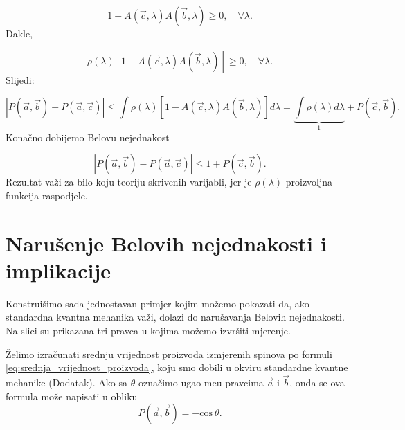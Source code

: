 \begin{equation}
    1 - A(\vec{c}, \lambda) A(\vec{b}, \lambda) \ge 0 , \quad \forall \lambda.
\end{equation}
Dakle,

\begin{equation}
    \rho (\lambda)[1 - A(\vec{c}, \lambda) A(\vec{b}, \lambda) ] \ge 0, \quad \forall \lambda.
\end{equation}
Slijedi:


\begin{equation}
    \left|{P(\vec{a}, \vec{b}) - P(\vec{a}, \vec{c})}\right| \le  \int  \rho (\lambda)  [1- A(\vec{c}, \lambda) A(\vec{b}, \lambda)  ]  d\lambda = \underbrace{\int \rho(\lambda)d\lambda}_{1} + P(\vec{c}, \vec{b}).
\end{equation}
Konačno dobijemo Belovu nejednakost

\begin{equation}
    \left|{P(\vec{a}, \vec{b}) - P(\vec{a}, \vec{c})}\right| \le 1 +  P(\vec{c}, \vec{b}).
\end{equation}
Rezultat važi za bilo koju teoriju skrivenih varijabli, jer je $\rho(\lambda)$ proizvoljna funkcija raspodjele.

\section{Narušenje Belovih nejednakosti i implikacije}

Konstruišimo sada jednostavan primjer kojim možemo pokazati da, ako standardna kvantna mehanika važi,  dolazi do narušavanja Belovih nejednakosti. Na slici
su prikazana tri pravca u kojima možemo izvršiti mjerenje.

Želimo izračunati srednju vrijednost proizvoda izmjerenih spinova po formuli \eqref{eq:srednja_vrijednost_proizvoda}, koju smo dobili u okviru standardne kvantne mehanike (Dodatak).
Ako sa $\theta$ ozna\v cimo ugao me\dj u pravcima $\vec{a}$ i $\vec{b}$, onda se ova formula mo\v ze napisati u obliku
\begin{equation}
    P(\vec{a},\vec{b}) = -\mathrm{cos} \:\! \theta.
\end{equation}

